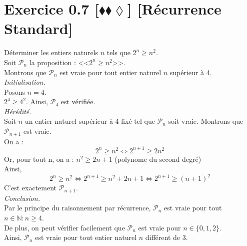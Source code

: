 \documentclass[10pt]{article}
\begin{document}
\section*{Exercice 0.7 [$\blacklozenge\blacklozenge\lozenge$] [Récurrence Standard]}
\begin{tcolorbox}[enhanced, width=7in, center, size=fbox, fontupper=\large, drop shadow southwest]
    Déterminer les entiers naturels $n$ tels que $2^n\geq n^2$.\\
    Soit $\mathcal{P}_n$ la proposition : <<$2^n\geq n^2$>>.\\
    Montrons que $\mathcal{P}_n$ est vraie pour tout entier naturel $n$ supérieur à 4.\\[0.5cm]
    \emph{Initialisation.}\\
    Posons $n=4$.\\
    $2^4 \geq 4^2$. Ainsi, $\mathcal{P}_4$ est vérifiée.\\[0.5cm]
    \emph{Hérédité.}\\
    Soit $n$ un entier naturel supérieur à 4 fixé tel que $\mathcal{P}_n$ soit vraie. Montrons que $\mathcal{P}_{n+1}$ est vraie.\\
    On a :
    \begin{equation*}
        2^n \geq n^2 \iff 2^{n+1} \geq 2n^2
    \end{equation*}
    Or, pour tout n, on a : $n^2 \geq 2n + 1$ (polynome du second degré)\\
    Ainsi,
    \begin{equation*}
        2^n \geq n^2 \iff 2^{n+1} \geq n^2 + 2n + 1 \iff 2^{n+1} \geq (n+1)^2
    \end{equation*}
    C'est exactement $\mathcal{P}_{n+1}$.\\[0.5cm]
    \emph{Conclusion.}\\
    Par le principe du raisonnement par récurrence, $\mathcal{P}_n$ est vraie pour tout $n\in\mathbb{N} : n\geq4$.\\
    De plus, on peut vérifier facilement que $\mathcal{P}_n$ est vraie pour $n\in\{0,1,2\}$.\\
    Ainsi, $\mathcal{P}_n$ est vraie pour tout entier naturel $n$ différent de 3.
\end{tcolorbox}
\end{document}
